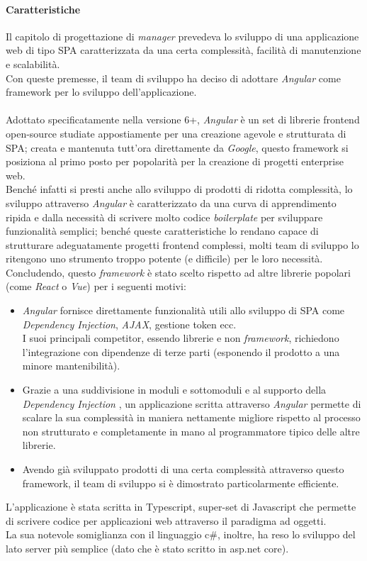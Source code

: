 \documentclass[12pt]{article}
\begin{document}
\paragraph{Caratteristiche}
Il capitolo di progettazione di \textit{manager} prevedeva lo sviluppo di una applicazione web di tipo SPA caratterizzata da una certa complessità, facilità di manutenzione e scalabilità.\\
Con queste premesse, il team di sviluppo ha deciso di adottare \textit{Angular} come framework per lo sviluppo dell'applicazione.\\\\
Adottato specificatamente nella versione 6+, \textit{Angular} è un set di librerie frontend open-source studiate appostiamente per una creazione agevole e strutturata di SPA; creata e mantenuta tutt'ora direttamente da \textit{Google}, questo framework si posiziona al primo posto per popolarità per la creazione di progetti enterprise web.\\
Benché infatti si presti anche allo sviluppo di prodotti di ridotta complessità, lo sviluppo attraverso \textit{Angular} è caratterizzato da una curva di apprendimento ripida e dalla necessità di scrivere molto codice \textit{boilerplate} per sviluppare funzionalità semplici; benché queste caratteristiche lo rendano capace di strutturare adeguatamente progetti frontend complessi, molti team di sviluppo lo ritengono uno strumento troppo potente (e difficile) per le loro necessità.\\
Concludendo, questo \textit{framework} è stato scelto rispetto ad altre librerie popolari (come \textit{React} o \textit{Vue}) per i seguenti motivi:
\begin{itemize}
\item \textit{Angular} fornisce direttamente funzionalità utili allo sviluppo di SPA come \textit{Dependency Injection}, \textit{AJAX}, gestione token ecc.\\
I suoi principali competitor, essendo librerie e non \textit{framework}, richiedono l'integrazione con dipendenze di terze parti (esponendo il prodotto a una minore mantenibilità).
\item Grazie a una suddivisione in moduli e sottomoduli e al supporto della \textit{Dependency Injection
}, un applicazione scritta attraverso \textit{Angular} permette di scalare la sua complessità in maniera nettamente migliore rispetto al processo non strutturato e completamente in mano al programmatore tipico delle altre librerie.
\item Avendo già sviluppato prodotti di una certa complessità attraverso questo framework, il team di sviluppo si è dimostrato particolarmente efficiente.
\end{itemize}
L'applicazione è stata scritta in Typescript, super-set di Javascript che permette di scrivere codice per applicazioni web attraverso il paradigma ad oggetti.\\
La sua notevole somiglianza con il linguaggio c\#, inoltre, ha reso lo sviluppo del lato server più semplice (dato che è stato scritto in asp.net core).
\end{document}

